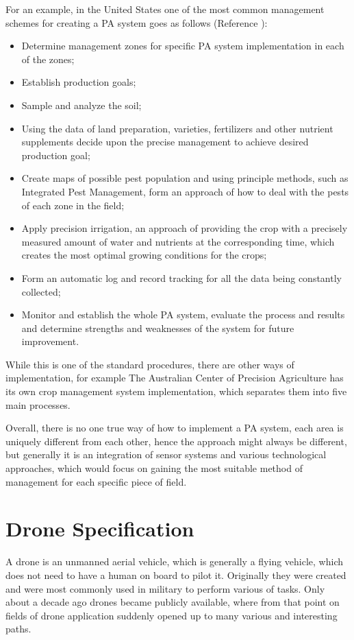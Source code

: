 \documentclass[11pt,a5paper,footinclude=true,headinclude=true, oneside]{scrbook}
\begin{document}
For an example, in the United States one of the most common management schemes for creating a PA system goes as follows (Reference \cite{tran_concept_nodate}):
\begin{itemize}
    \item Determine management zones for specific PA system implementation in each of the zones;
    \item Establish production goals;
    \item Sample and analyze the soil;
    \item Using the data of land preparation, varieties, fertilizers and other nutrient supplements decide upon the precise management to achieve desired production goal;
    \item Create maps of possible pest population and using principle methods, such as Integrated Pest Management, form an approach of how to deal with the pests of each zone in the field;
    \item Apply precision irrigation, an approach of providing the crop with a precisely measured amount of water and nutrients at the corresponding time, which creates the most optimal growing conditions for the crops;
    \item Form an automatic log and record tracking for all the data being constantly collected;
    \item Monitor and establish the whole PA system, evaluate the process and results and determine strengths and weaknesses of the system for future improvement.
\end{itemize}

While this is one of the standard procedures, there are other ways of implementation, for example The Australian Center of Precision Agriculture has its own crop management system implementation, which separates them into five main processes. 

Overall, there is no one true way of how to implement a PA system, each area is uniquely different from each other, hence the approach might always be different, but generally it is an integration of sensor systems and various technological approaches, which would focus on gaining the most suitable method of management for each specific piece of field.

\chapter{Drone Specification}

A drone is an unmanned aerial vehicle, which is generally a flying vehicle, which does not need to have a human on board to pilot it. Originally they were created and were most commonly used in military to perform various of tasks. Only about a decade ago drones became publicly available, where from that point on fields of drone application suddenly opened up to many various and interesting paths.
\end{document}

